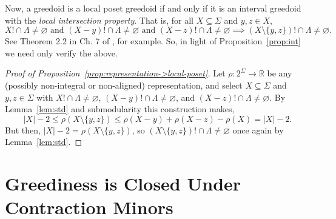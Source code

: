 \documentclass[11pt]{article}
\newcommand{\univ}{\Sigma}
\newcommand{\glang}{\Lambda}
\begin{document}
Now, a greedoid is a local poset greedoid if and only if it is an interval greedoid with the \emph{local intersection property}.
That is, for all $X\subseteq \univ$ and $y,z\in X$,
\[
    X!\cap\glang\neq\varnothing\text{ and }(X-y)!\cap\glang\neq\varnothing\text{ and }(X-z)!\cap\glang\neq\varnothing \implies (X\setminus\{y,z\})!\cap\glang\neq \varnothing.
\]
See Theorem 2.2 in Ch. 7 of \cite{korte2012greedoids}, for example.
So, in light of Proposition~\ref{prop:int} we need only verify the above.

\begin{proof}[Proof of Proposition~\ref{prop:representation->local-poset}]
    Let $\rho:2^\univ\to\mathbb{R}$ be any (possibly non-integral or non-aligned) representation, and select $X\subseteq \univ$ and $y,z\in\univ$ with $X!\cap\glang\neq\varnothing$, $(X-y)!\cap\glang\neq\varnothing$, and $(X-z)!\cap\glang\neq\varnothing$.
    By Lemma~\ref{lem:std} and submodularity this construction makes,
    \[
        |X| - 2 \leq \rho(X\setminus\{y,z\}) \leq \rho(X-y) + \rho(X-z) - \rho(X) = |X| - 2.
    \]
    But then, $|X| - 2 = \rho(X\setminus\{y,z\})$, so $(X\setminus\{y,z\})!\cap\glang \neq \varnothing$ once again by Lemma~\ref{lem:std}.
\end{proof}

\section{Greediness is Closed Under Contraction Minors}\label{app:greedy-minors}
\end{document}
